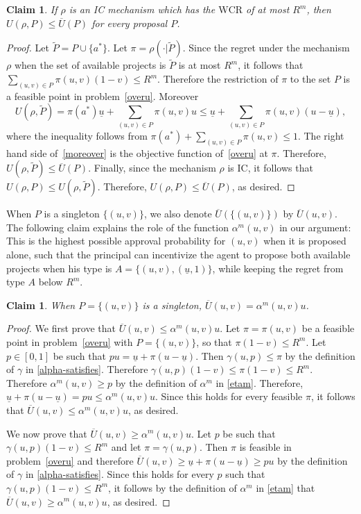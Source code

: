\documentclass[12pt,english]{article}
\newcommand{\under}{\underline}
\newcommand{\overU}{{\overline{U}}}
\newcommand{\underu}{{\underline{u}}}
\newcommand{\eran}[1]{\begin{framed}{\noindent {\bf Eran:} #1}\end{framed}}
\theoremstyle{remark}
\theoremstyle{plain}
\newtheorem{claim}[theorem]{Claim}
\theoremstyle{definition}
\newcommand{\wcr}{\mathrm{WCR}}
\begin{document}
\begin{claim}\label{cl:whyover}If $\rho$ is an IC mechanism which has the $\wcr$ of at most $R^m$, then $U(\rho,P)\leqslant \overU(P)$ for every proposal $P$.\end{claim}
\begin{proof}Let $\tilde P=P\cup\{a^\ast\}$. Let $\pi=\rho(\cdot|\tilde P)$. Since the regret under the mechanism $\rho$ when the set of available projects is $\tilde P$ is at most $R^m$, it follows that $\sum_{(u,v)\in P}\pi(u,v)(1-v)\leqslant R^m$. Therefore the restriction of $\pi$ to the set $P$ is a feasible point in problem~\eqref{overu}. Moreover
\begin{equation}\label{moreover}
U(\rho,\tilde P)=\pi(a^\ast)\underu+\sum_{(u,v)\in P}\pi(u,v)u\leqslant \underu+\sum_{(u,v)\in P}\pi(u,v) (u-\under u),\end{equation}
where the inequality follows from $\pi(a^\ast)+\sum_{(u,v)\in P}\pi(u,v)\leqslant 1$. The right hand side of~\eqref{moreover} is the objective function of~\eqref{overu} at $\pi$. Therefore, $U(\rho,\tilde P)\leqslant \overU(P)$. Finally, since the mechanism $\rho$ is IC, it follows that $U(\rho,P)\leqslant U(\rho,\tilde P)$. Therefore, $U(\rho,P)\leqslant \overU(P)$, as desired.
\end{proof}
When $P$ is a singleton $\{(u,v)\}$, we also denote $\overU(\{(u,v)\})$ by $\overU(u,v)$. The following claim explains the role of the function $\alpha^m(u,v)$ in our argument: This is the highest possible approval probability for $(u,v)$ when it is proposed alone, such that the principal can incentivize the agent to propose both available projects when his type is $A=\{(u,v),(\underu,1)\}$, while keeping the regret from type $A$ below $R^m$.
\begin{claim}\label{cl:singleton}When $P=\{(u,v)\}$ is a singleton, $\overU(u,v)=\alpha^m(u,v)u$.\end{claim}
\begin{proof} 
We first prove that $\overU(u,v)\leqslant \alpha^m(u,v)u$. 
Let $\pi=\pi(u,v)$ be a feasible point in problem~\eqref{overu} with $P=\{(u,v)\}$, so that $\pi(1-v)\leqslant R^m$. 
Let $p\in [0,1]$ be such that $pu=\underu +\pi (u-\under u)$. 
Then $\gamma(u,p)\leqslant\pi$ by the definition of $\gamma$ in \eqref{alpha-satisfies}. Therefore  
$\gamma(u,p)(1-v)\leqslant \pi(1-v)\leqslant R^m$. 
Therefore $\alpha^m(u,v)\geqslant p$ by the definition of $\alpha^m$ in \eqref{etam}. Therefore, $\underu +\pi (u-\under u)=pu\leqslant \alpha^m(u,v)u$. Since this holds for every feasible $\pi$, it follows that $\overU(u,v)\leqslant \alpha^m(u,v)u$, as desired.

 We now prove that $\overU(u,v)\geqslant \alpha^m(u,v)u$. Let $p$ be such that $\gamma(u,p)(1-v)\leqslant R^m$ and let $\pi=\gamma(u,p)$. Then $\pi$ is feasible in problem~\eqref{overu} and therefore $\overU(u,v)\geqslant \under u+\pi(u-\under u)\geqslant pu$ by the definition of $\gamma$ in \eqref{alpha-satisfies}.  Since this holds for every  $p$ such that $\gamma(u,p)(1-v)\leqslant R^m$, it follows by the definition of $\alpha^m$ in \eqref{etam} that $\overU(u,v)\geqslant \alpha^m(u,v)u$, as desired.
\end{proof}
\end{document}

